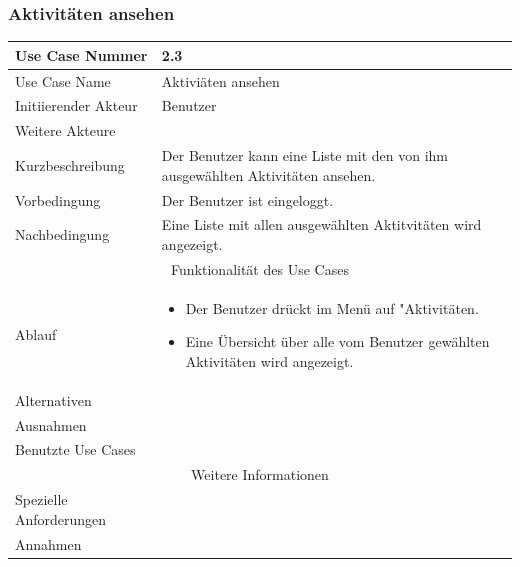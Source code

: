 \documentclass[10pt,a4paper]{article}
\begin{document}
\subsubsection{Aktivit\"aten ansehen}
	\begin{tabularx}{\textwidth}{|l|X|}
	\hline Use Case Nummer & 2.3 \\ 
	\hline Use Case Name & Aktivi\"aten ansehen \\ 
	\hline Initiierender Akteur & Benutzer \\
	\hline Weitere Akteure &  \\
	\hline Kurzbeschreibung & Der Benutzer kann eine Liste mit den von ihm ausgew\"ahlten Aktivit\"aten ansehen. \\
	\hline Vorbedingung & Der Benutzer ist eingeloggt. \\
	\hline Nachbedingung & Eine Liste mit allen ausgewählten Aktitvitäten wird angezeigt. \\
	\hline \multicolumn{2}{|c|}{Funktionalität des Use Cases}\\
	\hline Ablauf & \begin{itemize}
		\item Der Benutzer drückt im Menü auf "Aktivit\"aten.
		\item Eine Übersicht über alle vom Benutzer gewählten Aktivit\"aten wird angezeigt.
	\end{itemize} \\
	\hline Alternativen &  \\
	\hline Ausnahmen &  \\
	\hline Benutzte Use Cases &  \\
	\hline \multicolumn{2}{|c|}{Weitere Informationen} \\
	\hline Spezielle Anforderungen &  \\
	\hline Annahmen &  \\
	\hline
	\end{tabularx}
\end{document}
